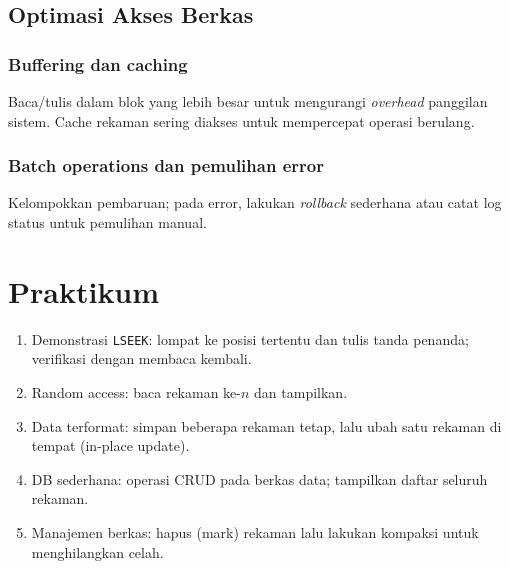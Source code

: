 \subsection{Optimasi Akses Berkas}
\subsubsection{Buffering dan caching}
Baca/tulis dalam blok yang lebih besar untuk mengurangi \textit{overhead} panggilan sistem. Cache rekaman sering diakses untuk mempercepat operasi berulang.

\subsubsection{Batch operations dan pemulihan error}
Kelompokkan pembaruan; pada error, lakukan \textit{rollback} sederhana atau catat log status untuk pemulihan manual.

\section{Praktikum}
\begin{enumerate}
  \item Demonstrasi \texttt{LSEEK}: lompat ke posisi tertentu dan tulis tanda penanda; verifikasi dengan membaca kembali.
  \item Random access: baca rekaman ke-\(n\) dan tampilkan.
  \item Data terformat: simpan beberapa rekaman tetap, lalu ubah satu rekaman di tempat (in-place update).
  \item DB sederhana: operasi CRUD pada berkas data; tampilkan daftar seluruh rekaman.
  \item Manajemen berkas: hapus (mark) rekaman lalu lakukan kompaksi untuk menghilangkan celah.
\end{enumerate}

